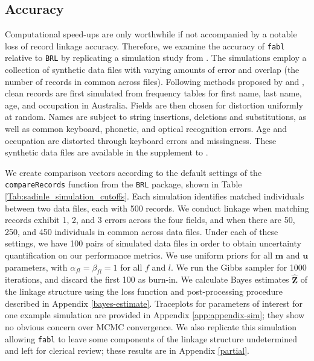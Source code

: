 \documentclass[ba]{imsart}
\begin{document}
	
	\hypertarget{accuracy}{%
		\subsection{Accuracy}\label{accuracy}}
	
	Computational speed-ups are only worthwhile if not accompanied by a notable loss of record linkage accuracy. Therefore, we examine the accuracy of \texttt{fabl} relative to \texttt{BRL} by replicating a simulation study from \cite{sadinle_bayesian_2017}. The simulations employ a collection of synthetic data files with varying amounts of error and overlap (the number of records in common across files). Following methods proposed by \cite{christen_pudjijono2009} and \cite{christen_vatsalan2013}, clean records are first simulated from frequency tables for first name, last name, age, and occupation in Australia. Fields are then chosen for distortion uniformly at random. Names are subject to string insertions, deletions and substitutions, as well as common keyboard, phonetic, and optical recognition errors. Age and occupation are distorted through keyboard errors and missingness. These synthetic data files are available in the supplement to \cite{sadinle_bayesian_2017}.
	
	We create comparison vectors according to the default settings of the \texttt{compareRecords} function from the \texttt{BRL} package, shown in Table \ref{Tab:sadinle_simulation_cutoffs}. Each simulation identifies matched individuals between two data files, each with 500 records. We conduct linkage when matching records exhibit 1, 2, and 3 errors across the four fields, and when there are 50, 250, and 450 individuals in common across data files. Under each of these settings, we have 100 pairs of simulated data files in order to obtain uncertainty quantification on our performance metrics. We use uniform priors for all $\bm{m}$ and $\bm{u}$ parameters, with $\alpha_{fl} = \beta_{fl} = 1$ for all $f$ and $l$. We run the Gibbs sampler for 1000 iterations, and discard the first 100 as burn-in. We calculate Bayes estimates $\hat{\bm{Z}}$ of the linkage structure using the  loss function and post-processing procedure described in Appendix \ref{bayes-estimate}. Traceplots for parameters of interest for one example simulation are provided in Appendix \ref{app:appendix-sim}; they show no obvious concern over MCMC convergence. We also replicate this simulation allowing \texttt{fabl} to leave some components of the linkage structure undetermined and left for clerical review; these results are in Appendix \ref{partial}.
	
\end{document}

